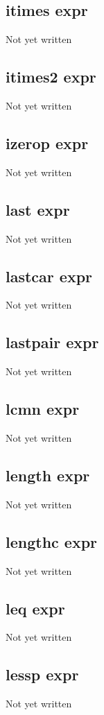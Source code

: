 \documentclass[a4paper,11pt]{article}
\begin{document}
\subsection{\ttfamily itimes expr}
Not yet written

\subsection{\ttfamily itimes2 expr}
Not yet written

\subsection{\ttfamily izerop expr}
Not yet written

\subsection{\ttfamily last expr}
Not yet written

\subsection{\ttfamily lastcar expr}
Not yet written

\subsection{\ttfamily lastpair expr}
Not yet written

\subsection{\ttfamily lcmn expr}
Not yet written

\subsection{\ttfamily length expr}
Not yet written

\subsection{\ttfamily lengthc expr}
Not yet written

\subsection{\ttfamily leq expr}
Not yet written

\subsection{\ttfamily lessp expr}
Not yet written
\end{document}
